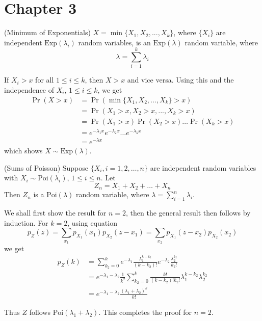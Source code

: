 \documentclass[  11pt]{article}
\newcommand{\p}{ {\Pr}}
\newcommand{\Exp}{\mbox{Exp}}
\newcommand{\Poi}{\mbox{Poi}}
\begin{document}
\newpage
\section*{Chapter 3 }
\setcounter{Exercise}{0}

\begin{ExerciseList}

\Exercise(Minimum of Exponentials) 
$X = \min\{X_1,X_2,...,X_k\}$,  where $\{X_i\}$ are independent $\Exp(\lambda_i)$ random variables, is an $\Exp(\lambda)$ random variable, where 
\[\lambda = \sum_{i=1}^{k} \lambda_i \]


\Answer
If $X_i > x$ for all $1\le i\le k$, then $X > x$ and vice versa. Using this and the independence of $X_i$, $1\le i \le k$, we get
\[\begin{split}
\p(X>x) & =  \p(\min\{X_1,X_2,...,X_k\} > x) \\
& = \p(X_1>x,X_2>x,...,X_k>x) \\
& = \p(X_1>x) \p(X_2>x)\dots \p(X_k>x) \\
& = e^{-\lambda_1 x}e^{-\lambda_2 x}\dots e^{-\lambda_k x} \\
& = e^{-\lambda x}
\end{split}\]
which shows $X\sim \Exp(\lambda)$. 





\Exercise (Sums of Poisson) Suppose $\{X_i, i = 1, 2, \dots, n\}$ are independent random variables with $X_i \sim \Poi(\lambda_i)$, $1\le i \le n$. Let
\[Z_n = X_1+X_2+\dots + X_n\]
Then $Z_n$ is a $\Poi(\lambda)$ random variable, where 
$\lambda = \sum_{i=1}^{n}\lambda_i$.


\Answer
We shall  first show the result for $n=2$,
then the general result then follows by induction. 
For $k=2$, using equation \[p_Z(z) = \sum_{x_1}p_{X_1}(x_1)p_{X_2}(z-x_1) = \sum_{x_2}p_{X_1}(z-x_2)p_{X_2}(x_2)\] we get
\[\begin{split}
p_Z(k) & = \sum_{k_2 = 0}^{k} e^{-\lambda_1}\frac{\lambda_1^{k-k_2}}{(k-k_2)!}e^{-\lambda_2}\frac{\lambda_2^{k_2}}{k_2 !} \\
& = e^{-\lambda_1-\lambda_2} \frac{1}{k^2}\sum_{k_2=0}^{k}\frac{k!}{(k-k_2)!k_2 !}\lambda_1^{k-k_2}\lambda_2^{k_2} \\
& = e^{-\lambda_1-\lambda_2} \frac{(\lambda_1+\lambda_2)^k}{k!}
\end{split}\]

Thus $Z$ follows $\Poi(\lambda_1+\lambda_2)$. This completes the proof for $n=2$.\\
 

\end{ExerciseList}
\end{document}

